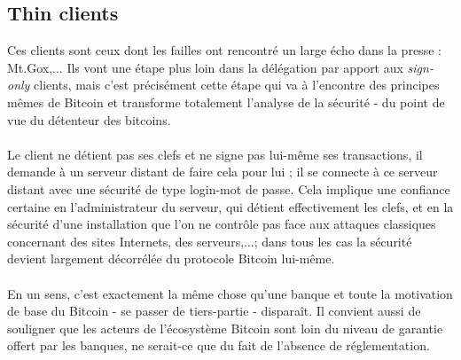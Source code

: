 \documentclass[11pt,a4paper]{article}
\begin{document}
\subsection{Thin clients}
Ces clients sont ceux dont les failles ont rencontré un large écho dans la presse : Mt.Gox,... Ils vont une étape plus loin dans la délégation par apport aux \textit{sign-only} clients, mais c'est précisément cette étape qui va à l'encontre des principes mêmes de Bitcoin et transforme totalement l'analyse de la sécurité - du point de vue du détenteur des bitcoins.\\\\
Le client ne détient pas ses clefs et ne signe pas lui-même ses transactions, il demande à un serveur distant de faire cela pour lui ; il se connecte à ce serveur distant avec une sécurité de type login-mot de passe. Cela implique une confiance certaine en l'administrateur du serveur, qui détient effectivement les clefs, et en la sécurité d'une installation que l'on ne contrôle pas face aux attaques classiques concernant des sites Internets, des serveurs,...; dans tous les cas la sécurité devient largement décorrélée du protocole Bitcoin lui-même.\\\\ En un sens, c'est exactement la même chose qu'une banque et toute la motivation de base du Bitcoin - se passer de tiers-partie - disparaît. Il convient aussi de souligner que les acteurs de l'écosystème Bitcoin sont loin du niveau de garantie offert par les banques, ne serait-ce que du fait de l'absence de réglementation.

{}

\end{document}

